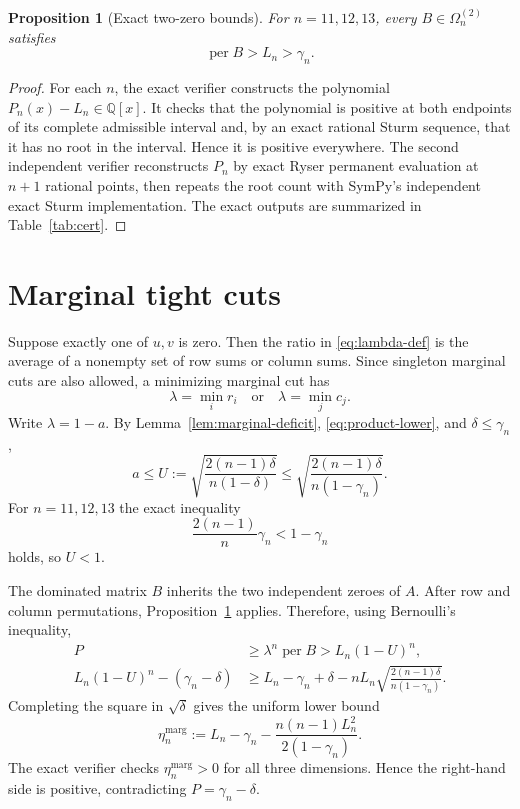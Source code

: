 \documentclass[11pt]{article}
\newtheorem{proposition}[theorem]{Proposition}
\theoremstyle{remark}
\newcommand{\per}{\operatorname{per}}
\newcommand{\QQ}{\mathbb Q}
\begin{document}
\begin{proposition}[Exact two-zero bounds]\label{prop:L}
For $n=11,12,13$, every $B\in\Omega_n^{(2)}$ satisfies
\[
 \per B>L_n>\gamma_n.
\]
\end{proposition}
\begin{proof}
For each $n$, the exact verifier constructs the polynomial $P_n(x)-L_n\in\QQ[x]$. It checks that the polynomial is positive at both endpoints of its complete admissible interval and, by an exact rational Sturm sequence, that it has no root in the interval. Hence it is positive everywhere. The second independent verifier reconstructs $P_n$ by exact Ryser permanent evaluation at $n+1$ rational points, then repeats the root count with SymPy's independent exact Sturm implementation. The exact outputs are summarized in Table~\ref{tab:cert}.
\end{proof}

\section{Marginal tight cuts}
Suppose exactly one of $u,v$ is zero. Then the ratio in \eqref{eq:lambda-def} is the average of a nonempty set of row sums or column sums. Since singleton marginal cuts are also allowed, a minimizing marginal cut has
\[
 \lambda=\min_i r_i
 \quad\text{or}\quad
 \lambda=\min_j c_j.
\]
Write $\lambda=1-a$. By Lemma~\ref{lem:marginal-deficit}, \eqref{eq:product-lower}, and $\delta\le\gamma_n$,
\begin{equation}\label{eq:U}
 a\le U:=\sqrt{\frac{2(n-1)\delta}{n(1-\delta)}}
 \le\sqrt{\frac{2(n-1)\delta}{n(1-\gamma_n)}}.
\end{equation}
For $n=11,12,13$ the exact inequality
\[
 \frac{2(n-1)}n\gamma_n<1-\gamma_n
\]
holds, so $U<1$.

The dominated matrix $B$ inherits the two independent zeroes of $A$. After row and column permutations, Proposition~\ref{prop:L} applies. Therefore, using Bernoulli's inequality,
\begin{align}
 P&\ge\lambda^n\per B>L_n(1-U)^n,\\
 L_n(1-U)^n-(\gamma_n-\delta)
 &\ge L_n-\gamma_n+\delta
 -nL_n\sqrt{\frac{2(n-1)\delta}{n(1-\gamma_n)}}.
\end{align}
Completing the square in $\sqrt\delta$ gives the uniform lower bound
\begin{equation}\label{eq:eta-marg}
 \eta_n^{\mathrm{marg}}
 :=L_n-\gamma_n-
 \frac{n(n-1)L_n^2}{2(1-\gamma_n)}.
\end{equation}
The exact verifier checks $\eta_n^{\mathrm{marg}}>0$ for all three dimensions. Hence the right-hand side is positive, contradicting $P=\gamma_n-\delta$.
\end{document}
